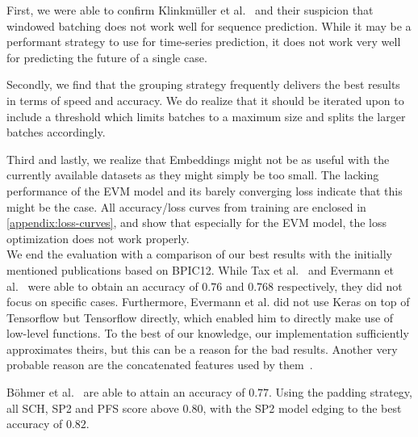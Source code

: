 First, we were able to confirm Klinkmüller et al.~\cite{klinkmuller2018reliablemonitoring} and their suspicion that windowed batching does not work well for sequence prediction. While it may be a performant strategy to use for time-series prediction, it does not work very well for predicting the future of a single case.

Secondly, we find that the grouping strategy frequently delivers the best results in terms of speed and accuracy. We do realize that it should be iterated upon to include a threshold which limits batches to a maximum size and splits the larger batches accordingly.

Third and lastly, we realize that Embeddings might not be as useful with the currently available datasets as they might simply be too small. The lacking performance of the EVM model and its barely converging loss indicate that this might be the case. All accuracy/loss curves from training are enclosed in \autoref{appendix:loss-curves}, and show that especially for the EVM model, the loss optimization does not work properly.\\

We end the evaluation with a comparison of our best results with the initially mentioned publications based on BPIC12. While Tax et al.~\cite{tax2017} and Evermann et al.~\cite{evermann2016} were able to obtain an accuracy of $0.76$ and $0.768$ respectively, they did not focus on specific cases. Furthermore, Evermann et al. did not use Keras on top of Tensorflow but Tensorflow directly, which enabled him to directly make use of low-level functions. To the best of our knowledge, our implementation sufficiently approximates theirs, but this can be a reason for the bad results. Another very probable reason are the concatenated features used by them~\cite{evermann2016}.

Böhmer et al.~\cite{boehmer2018probability} are able to attain an accuracy of $0.77$. Using the padding strategy, all SCH, SP2 and PFS score above $0.80$, with the SP2 model edging to the best accuracy of $0.82$.
